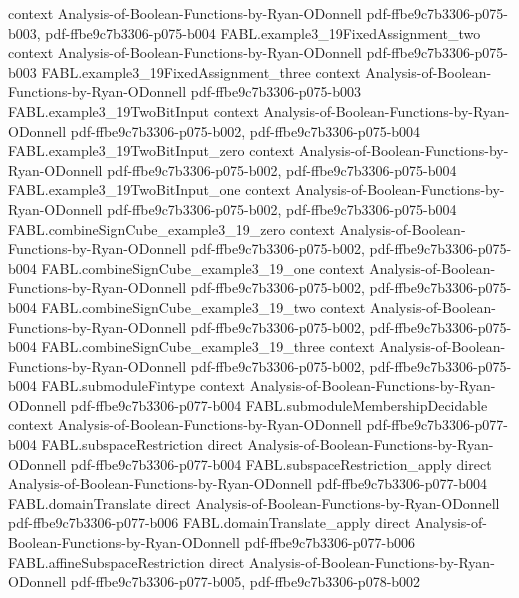 \begin{theorem}
  {context}
  {Analysis-of-Boolean-Functions-by-Ryan-ODonnell}
  {pdf-ffbe9c7b3306-p075-b003,
    pdf-ffbe9c7b3306-p075-b004}
\proofstep
  {FABL.example3_19FixedAssignment_two}
  {context}
  {Analysis-of-Boolean-Functions-by-Ryan-ODonnell}
  {pdf-ffbe9c7b3306-p075-b003}
\proofstep
  {FABL.example3_19FixedAssignment_three}
  {context}
  {Analysis-of-Boolean-Functions-by-Ryan-ODonnell}
  {pdf-ffbe9c7b3306-p075-b003}
\proofstep
  {FABL.example3_19TwoBitInput}
  {context}
  {Analysis-of-Boolean-Functions-by-Ryan-ODonnell}
  {pdf-ffbe9c7b3306-p075-b002,
    pdf-ffbe9c7b3306-p075-b004}
\proofstep
  {FABL.example3_19TwoBitInput_zero}
  {context}
  {Analysis-of-Boolean-Functions-by-Ryan-ODonnell}
  {pdf-ffbe9c7b3306-p075-b002,
    pdf-ffbe9c7b3306-p075-b004}
\proofstep
  {FABL.example3_19TwoBitInput_one}
  {context}
  {Analysis-of-Boolean-Functions-by-Ryan-ODonnell}
  {pdf-ffbe9c7b3306-p075-b002,
    pdf-ffbe9c7b3306-p075-b004}
\proofstep
  {FABL.combineSignCube_example3_19_zero}
  {context}
  {Analysis-of-Boolean-Functions-by-Ryan-ODonnell}
  {pdf-ffbe9c7b3306-p075-b002,
    pdf-ffbe9c7b3306-p075-b004}
\proofstep
  {FABL.combineSignCube_example3_19_one}
  {context}
  {Analysis-of-Boolean-Functions-by-Ryan-ODonnell}
  {pdf-ffbe9c7b3306-p075-b002,
    pdf-ffbe9c7b3306-p075-b004}
\proofstep
  {FABL.combineSignCube_example3_19_two}
  {context}
  {Analysis-of-Boolean-Functions-by-Ryan-ODonnell}
  {pdf-ffbe9c7b3306-p075-b002,
    pdf-ffbe9c7b3306-p075-b004}
\proofstep
  {FABL.combineSignCube_example3_19_three}
  {context}
  {Analysis-of-Boolean-Functions-by-Ryan-ODonnell}
  {pdf-ffbe9c7b3306-p075-b002,
    pdf-ffbe9c7b3306-p075-b004}
\proofstep
  {FABL.submoduleFintype}
  {context}
  {Analysis-of-Boolean-Functions-by-Ryan-ODonnell}
  {pdf-ffbe9c7b3306-p077-b004}
\proofstep
  {FABL.submoduleMembershipDecidable}
  {context}
  {Analysis-of-Boolean-Functions-by-Ryan-ODonnell}
  {pdf-ffbe9c7b3306-p077-b004}
\proofstep
  {FABL.subspaceRestriction}
  {direct}
  {Analysis-of-Boolean-Functions-by-Ryan-ODonnell}
  {pdf-ffbe9c7b3306-p077-b004}
\proofstep
  {FABL.subspaceRestriction_apply}
  {direct}
  {Analysis-of-Boolean-Functions-by-Ryan-ODonnell}
  {pdf-ffbe9c7b3306-p077-b004}
\proofstep
  {FABL.domainTranslate}
  {direct}
  {Analysis-of-Boolean-Functions-by-Ryan-ODonnell}
  {pdf-ffbe9c7b3306-p077-b006}
\proofstep
  {FABL.domainTranslate_apply}
  {direct}
  {Analysis-of-Boolean-Functions-by-Ryan-ODonnell}
  {pdf-ffbe9c7b3306-p077-b006}
\proofstep
  {FABL.affineSubspaceRestriction}
  {direct}
  {Analysis-of-Boolean-Functions-by-Ryan-ODonnell}
  {pdf-ffbe9c7b3306-p077-b005,
    pdf-ffbe9c7b3306-p078-b002}

\end{theorem}
